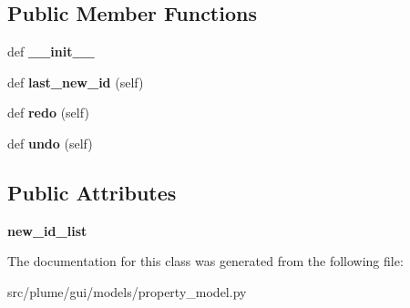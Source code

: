 \subsection*{Public Member Functions}
\begin{DoxyCompactItemize}
\item 
def {\bfseries \+\_\+\+\_\+init\+\_\+\+\_\+}\hypertarget{classplume-creator_1_1src_1_1plume_1_1gui_1_1models_1_1property__model_1_1_add_property_command_afc783b5db0ec84696e128d830d6944ef}{}\label{classplume-creator_1_1src_1_1plume_1_1gui_1_1models_1_1property__model_1_1_add_property_command_afc783b5db0ec84696e128d830d6944ef}

\item 
def {\bfseries last\+\_\+new\+\_\+id} (self)\hypertarget{classplume-creator_1_1src_1_1plume_1_1gui_1_1models_1_1property__model_1_1_add_property_command_a936f3d4610658a1074f9aa2402130c64}{}\label{classplume-creator_1_1src_1_1plume_1_1gui_1_1models_1_1property__model_1_1_add_property_command_a936f3d4610658a1074f9aa2402130c64}

\item 
def {\bfseries redo} (self)\hypertarget{classplume-creator_1_1src_1_1plume_1_1gui_1_1models_1_1property__model_1_1_add_property_command_a37906023efa2432868401c4aabd7f979}{}\label{classplume-creator_1_1src_1_1plume_1_1gui_1_1models_1_1property__model_1_1_add_property_command_a37906023efa2432868401c4aabd7f979}

\item 
def {\bfseries undo} (self)\hypertarget{classplume-creator_1_1src_1_1plume_1_1gui_1_1models_1_1property__model_1_1_add_property_command_a0fecfe7a9c67b1b180241fa1c58d4248}{}\label{classplume-creator_1_1src_1_1plume_1_1gui_1_1models_1_1property__model_1_1_add_property_command_a0fecfe7a9c67b1b180241fa1c58d4248}

\end{DoxyCompactItemize}
\subsection*{Public Attributes}
\begin{DoxyCompactItemize}
\item 
{\bfseries new\+\_\+id\+\_\+list}\hypertarget{classplume-creator_1_1src_1_1plume_1_1gui_1_1models_1_1property__model_1_1_add_property_command_ad815fd5caf9aca298ca1c54f51ca0774}{}\label{classplume-creator_1_1src_1_1plume_1_1gui_1_1models_1_1property__model_1_1_add_property_command_ad815fd5caf9aca298ca1c54f51ca0774}

\end{DoxyCompactItemize}


The documentation for this class was generated from the following file\+:\begin{DoxyCompactItemize}
\item 
src/plume/gui/models/property\+\_\+model.\+py\end{DoxyCompactItemize}
